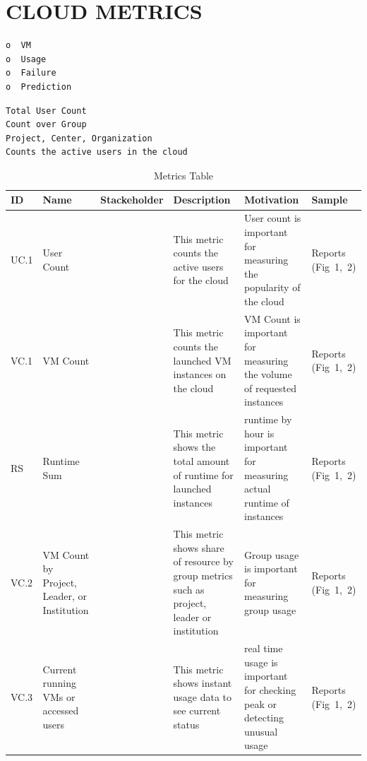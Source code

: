 \documentclass{sig-alternate-05-2015}
\begin{document}
\section{CLOUD METRICS}

\begin{verbatim}
o  VM
o  Usage
o  Failure
o  Prediction
\end{verbatim}

\begin{verbatim}
Total User Count
Count over Group
Project, Center, Organization
Counts the active users in the cloud
\end{verbatim}


\begin{table}[htb]

\caption{Metrics Table}
\begin{scriptsize}
\label{T:metrics}
\bigskip
\begin{tabular}{lp{}p{}p{}p{}p{}}
ID & Name & Stackeholder & Description & Motivation & Sample \\
\hline
UC.1&
User Count & 
~&
This metric counts the active users for the cloud &
User count is important for measuring the popularity of the cloud & 
Reports (Fig~1,~2) \\
\hline
VC.1&
VM Count & 
~&
This metric counts the launched VM instances on the cloud &
VM Count is important for measuring the volume of requested instances &
Reports (Fig~1,~2) \\
\hline
RS&
Runtime Sum&
~&
This metric shows the total amount of runtime for launched instances &
runtime by hour is important for measuring actual runtime of instances &
Reports (Fig~1,~2) \\
\hline
VC.2&
VM Count by Project, Leader, or Institution &
~&
This metric shows share of resource by group metrics such as project, leader or institution &
Group usage is important for measuring group usage &
Reports (Fig~1,~2) \\
\hline
VC.3 &
Current running VMs or accessed users &
~&
This metric shows instant usage data to see current status &
real time usage is important for checking peak or detecting unusual usage &
Reports (Fig~1,~2) \\
\hline
\end{tabular}
\end{scriptsize}
\end{table}
\end{document}

